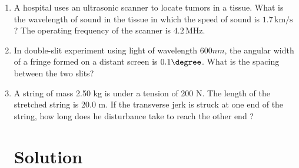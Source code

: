 \begin{enumerate}[label=\thesection.\arabic*,ref=\thesection.\theenumi]
\item
A hospital uses an ultrasonic scanner to locate tumors in a tissue. What is the wavelength of sound in the tissue in which the speed of sound is $1.7 \, \text{km/s}$? The operating frequency of the scanner is $4.2 \, \text{MHz}$.
\solution
\pagebreak

\item In double-slit experiment using light of wavelength $600 nm$, the
angular width of a fringe formed on a distant screen is $0.1\degree$. What is
the spacing between the two slits?\\
\solution
\pagebreak


\item A string of mass 2.50 kg is under a tension of 200 N. The length of the stretched string is 20.0 m. If the transverse jerk is struck at one end of the string, how long does he disturbance take to reach the other end ? 
\solution
\pagebreak
\section{Solution}


\end{enumerate}
